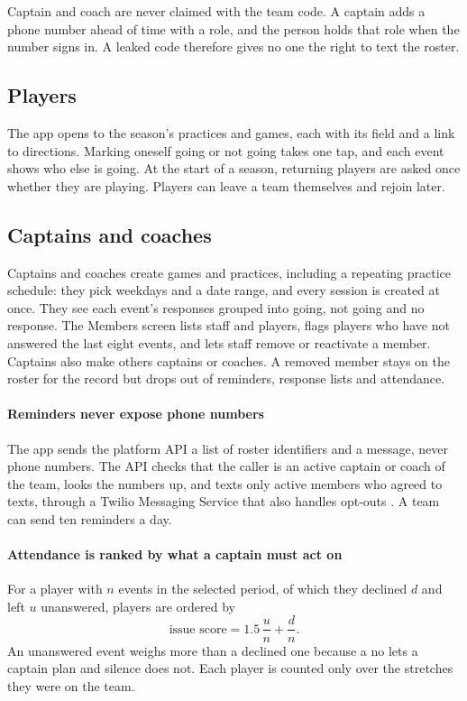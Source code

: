 \documentclass[letterpaper,11pt]{article}
\begin{document}
Captain and coach are never claimed with the team code. A captain adds a phone number ahead of
time with a role, and the person holds that role when the number signs in. A leaked code
therefore gives no one the right to text the roster.

\subsection{Players}

The app opens to the season's practices and games, each with its field and a link to directions.
Marking oneself going or not going takes one tap, and each event shows who else is going. At the
start of a season, returning players are asked once whether they are playing. Players can leave a
team themselves and rejoin later.

\subsection{Captains and coaches}

Captains and coaches create games and practices, including a repeating practice schedule: they
pick weekdays and a date range, and every session is created at once. They see each event's
responses grouped into going, not going and no response. The Members screen lists staff and
players, flags players who have not answered the last eight events, and lets staff remove or
reactivate a member. Captains also make others captains or coaches. A removed member stays on the
roster for the record but drops out of reminders, response lists and attendance.

\paragraph{Reminders never expose phone numbers} The app sends the platform API a list of roster
identifiers and a message, never phone numbers. The API checks that the caller is an active
captain or coach of the team, looks the numbers up, and texts only active members who agreed to
texts, through a Twilio Messaging Service that also handles opt-outs \citep{Twilio}. A team can
send ten reminders a day.

\paragraph{Attendance is ranked by what a captain must act on} For a player with $n$ events in the
selected period, of which they declined $d$ and left $u$ unanswered, players are ordered by
\begin{equation}
\text{issue score} = 1.5\,\frac{u}{n} + \frac{d}{n}.
\label{e:issue}\end{equation}
An unanswered event weighs more than a declined one because a no lets a captain plan and silence
does not. Each player is counted only over the stretches they were on the team.
\end{document}
